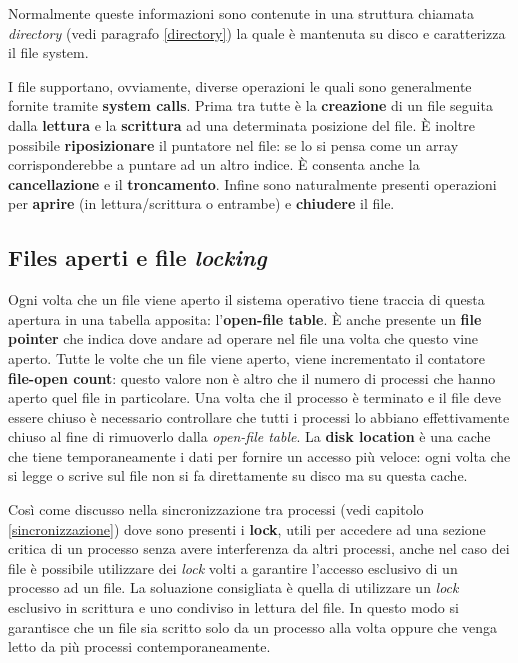 Normalmente queste informazioni sono contenute in una struttura chiamata \textit{directory} (vedi paragrafo \ref{directory}) la quale è mantenuta su disco e caratterizza il file system. 

I file supportano, ovviamente, diverse operazioni le quali sono generalmente fornite tramite \textbf{system calls}. Prima tra tutte è la \textbf{creazione} di un file seguita dalla \textbf{lettura} e la \textbf{scrittura} ad una determinata posizione del file. È inoltre possibile \textbf{riposizionare} il puntatore nel file: se lo si pensa come un array corrisponderebbe a puntare ad un altro indice. È consenta anche la \textbf{cancellazione} e il \textbf{troncamento}. Infine sono naturalmente presenti operazioni per \textbf{aprire} (in lettura/scrittura o entrambe) e \textbf{chiudere} il file.

% 
\subsection{Files aperti e file \textit{locking}}
Ogni volta che un file viene aperto il sistema operativo tiene traccia di questa apertura in una tabella apposita: l'\textbf{open-file table}. È anche presente un \textbf{file pointer} che indica dove andare ad operare nel file una volta che questo vine aperto. Tutte le volte che un file viene aperto, viene incrementato il contatore \textbf{file-open count}: questo valore non è altro che il numero di processi che hanno aperto quel file in particolare. Una volta che il processo è terminato e il file deve essere chiuso è necessario controllare che tutti i processi lo abbiano effettivamente chiuso al fine di rimuoverlo dalla \textit{open-file table}. La \textbf{disk location} è una cache che tiene temporaneamente i dati per fornire un accesso più veloce: ogni volta che si legge o scrive sul file non si fa direttamente su disco ma su questa cache.

Così come discusso nella sincronizzazione tra processi (vedi capitolo \ref{sincronizzazione}) dove sono presenti i \textbf{lock}, utili per accedere ad una sezione critica di un processo senza avere interferenza da altri processi, anche nel caso dei file è possibile utilizzare dei \textit{lock} volti a garantire l'accesso esclusivo di un processo ad un file. La soluazione consigliata è quella di utilizzare un \textit{lock} esclusivo in scrittura e uno condiviso in lettura del file. In questo modo si garantisce che un file sia scritto solo da un processo alla volta oppure che venga letto da più processi contemporaneamente.

